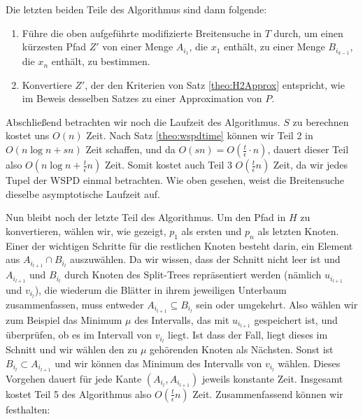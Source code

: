     Die letzten beiden Teile des Algorithmus sind dann folgende:
    \begin{enumerate}[start=4, topsep=4mm]
    	\item Führe die oben aufgeführte modifizierte Breitensuche in $T$ durch, um einen kürzesten Pfad $Z'$ von einer Menge $A_{i_1}$, die $x_1$ enthält, zu einer Menge $B_{i_{k-1}}$, die $x_n$ enthält, zu bestimmen.
    	\item Konvertiere $Z'$, der den Kriterien von Satz \ref{theo:H2Approx} entspricht, wie im Beweis desselben Satzes zu einer Approximation von $P$.
    \end{enumerate}
    Abschließend betrachten wir noch die Laufzeit des Algorithmus. $S$ zu berechnen kostet uns $O(n)$ Zeit. 
    Nach Satz \ref{theo:wspdtime} können wir Teil 2 in $O(n \log n + sn)$ Zeit schaffen, und da $O(sn) = O(\frac{t}{\epsilon}\cdot n)$, dauert dieser Teil also $O(n \log n + \frac{t}{\epsilon}n)$ Zeit. 
    Somit kostet auch Teil 3 $O(\frac{t}{\epsilon}n)$ Zeit, da wir jedes Tupel der WSPD einmal betrachten. 
    Wie oben gesehen, weist die Breitensuche dieselbe asymptotische Laufzeit auf. 
    
    Nun bleibt noch der letzte Teil des Algorithmus. 
    Um den Pfad in $H$ zu konvertieren, wählen wir, wie gezeigt, $p_1$ als ersten und $p_n$ als letzten Knoten. 
    Einer der wichtigen Schritte für die restlichen Knoten besteht darin, ein Element aus $A_{i_{l+1}} \cap B_{i_l}$ auszuwählen. 
    Da wir wissen, dass der Schnitt nicht leer ist und $A_{i_{l+1}}$ und $B_{i_l}$ durch Knoten des Split-Trees repräsentiert werden (nämlich $u_{i_{l+1}}$ und $v_{i_l}$), die wiederum die Blätter in ihrem jeweiligen Unterbaum zusammenfassen, muss entweder $A_{i_{l+1}}\subseteq B_{i_l}$ sein oder umgekehrt. 
    Also wählen wir zum Beispiel das Minimum $\mu$ des Intervalls, das mit $u_{i_{l+1}}$ gespeichert ist, und überprüfen, ob es im Intervall von $v_{i_l}$ liegt. 
    Ist dass der Fall, liegt dieses im Schnitt und wir wählen den zu $\mu$ gehörenden Knoten als Nächsten. 
    Sonst ist $B_{i_l}\subset A_{i_{l+1}}$ und wir können das Minimum des Intervalls von $v_{i_l}$ wählen. 
    Dieses Vorgehen dauert für jede Kante $(A_{i_l}, A_{i_{l+1}})$ jeweils konstante Zeit. 
    Insgesamt kostet Teil 5 des Algorithmus also $O(\frac{t}{\epsilon}n)$ Zeit.
    Zusammenfassend können wir festhalten:
    
